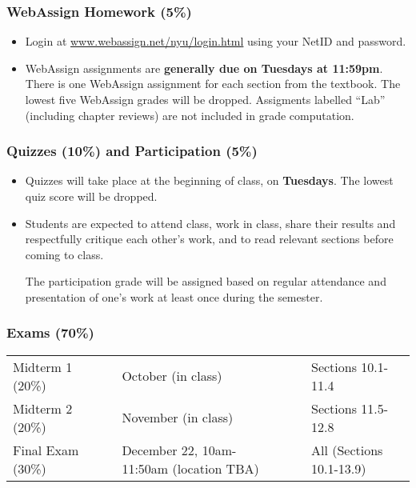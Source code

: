 \documentclass[10pt]{article}
\theoremstyle{definition}
\begin{document}
\subsubsection*{WebAssign Homework (5\%)}

\begin{itemize}
\item Login at {\footnotesize \url{www.webassign.net/nyu/login.html}} using your NetID and password.
\item WebAssign assignments are \textbf{generally due on Tuesdays at 11:59pm}.  There is one WebAssign assignment for each section from the textbook.  The lowest five WebAssign grades will be dropped.  Assigments labelled ``Lab'' (including chapter reviews) are not included in grade computation.
\end{itemize}

\subsubsection*{Quizzes (10\%) and Participation (5\%)}

\begin{itemize}
\item Quizzes will take place at the beginning of class, on \textbf{Tuesdays}.  The lowest quiz score will be dropped.
\item Students are expected to attend class, work in class, share their results and respectfully critique each other's work, and to read relevant sections before coming to class.  

The participation grade will be assigned based on regular attendance and presentation of one's work at least once during the semester.
\end{itemize}

\subsubsection*{Exams (70\%)}

\begin{center}
\begin{tabular}{l c l c l}
Midterm 1 (20\%) & ~ & October  (in class) & ~ & Sections 10.1-11.4\\
Midterm 2 (20\%) & ~ & November (in class) & ~ & Sections 11.5-12.8\\
Final Exam (30\%) & ~ & December 22, 10am-11:50am (location TBA) & ~ & All (Sections 10.1-13.9)
\end{tabular}
\end{center}
\end{document}
